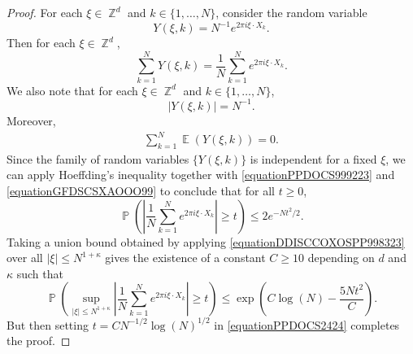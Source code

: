 \documentclass[dvipsnames,letterpaper,12pt]{article}
\numberwithin{equation}{section}
\DeclareMathOperator{\ZZ}{\mathbb{Z}}
\numberwithin{theorem}{section}
\DeclareMathOperator{\EE}{\mathbb{E}}
\DeclareMathOperator{\PP}{\mathbb{P}}
\begin{document}
\begin{proof}
    For each $\xi \in \ZZ^d$ and $k \in \{ 1, \dots, N \}$, consider the random variable
    \[ Y(\xi,k) = N^{-1} e^{2 \pi i \xi \cdot X_k}. \]    
    Then for each $\xi \in \ZZ^d$,
    \begin{equation} \label{equationPPDOCS999223}
        \sum_{k = 1}^N Y(\xi,k) = \frac{1}{N} \sum_{k = 1}^N e^{2 \pi i \xi \cdot X_k}.
    \end{equation}
    We also note that for each $\xi \in \ZZ^d$ and $k \in \{ 1, \dots, N \}$,
    \begin{equation} \label{equationGFDSCSXAOOO99}
        |Y(\xi,k)| = N^{-1}.
    \end{equation}
    Moreover,
    \begin{equation} \label{equationDOIJWIJCCCCC5555322}
    \begin{split}
        \sum_{k = 1}^N \EE(Y(\xi,k)) = 0.
    \end{split}
    \end{equation}
    Since the family of random variables $\{ Y(\xi,k) \}$ is independent for a fixed $\xi$, we can apply Hoeffding's inequality together with \eqref{equationPPDOCS999223} and \eqref{equationGFDSCSXAOOO99} to conclude that for all $t \geq 0$,
    \begin{equation} \label{equationDDISCCOXOSPP998323}
        \PP \left( \left| \frac{1}{N} \sum_{k = 1}^N e^{2 \pi i \xi \cdot X_k} \right| \geq t \right) \leq 2 e^{-Nt^2/2}.
    \end{equation}
    Taking a union bound obtained by applying \eqref{equationDDISCCOXOSPP998323} over all $|\xi| \leq N^{1 + \kappa}$ gives the existence of a constant $C \geq 10$ depending on $d$ and $\kappa$ such that
    \begin{equation} \label{equationPPDOCS2424}
        \PP \left( \sup_{|\xi| \leq N^{1 + \kappa}} \left| \frac{1}{N} \sum_{k = 1}^N e^{2 \pi i \xi \cdot X_k} \right| \geq t \right) \leq \exp \left( C \log(N) - \frac{5N t^2}{C} \right).
    \end{equation}
    But then setting $t = CN^{-1/2} \log(N)^{1/2}$ in \eqref{equationPPDOCS2424} completes the proof.
\end{proof}
\end{document}
